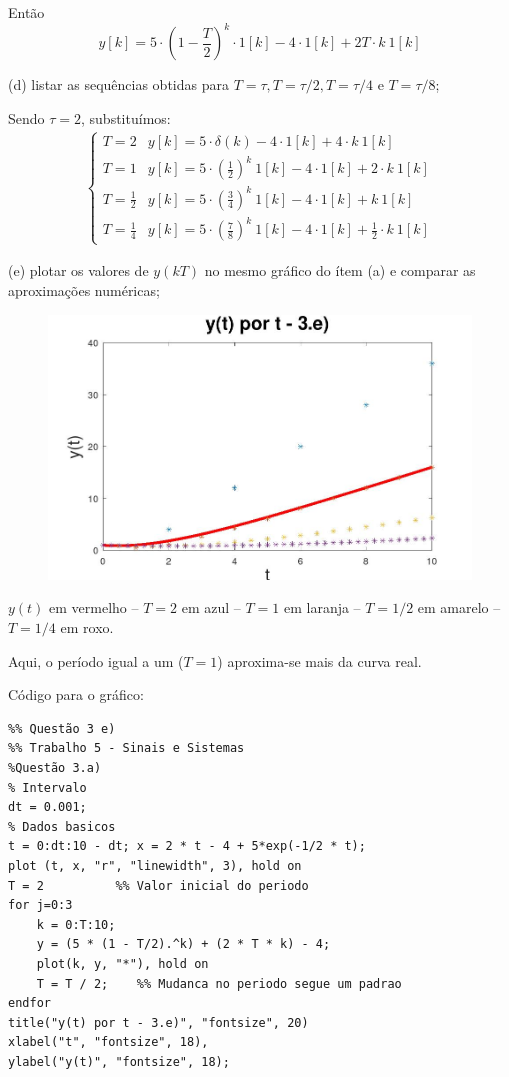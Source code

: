 \documentclass[10pt]{article}
\begin{document}
Então
\[y[k] = 5 \cdot \left(1 - \frac{T}{2}\right)^k \cdot 1[k] - 4 \cdot 1[k] + 2T \cdot k\ 1[k]\]

(d) listar as sequências obtidas para $T = \tau, T = \tau / 2, T = \tau / 4 \text{ e } T = \tau / 8$;

Sendo $\tau = 2$, substituímos:
\begin{align*}
    \begin{cases}
        T = 2 & y[k] = 5 \cdot \delta(k) - 4 \cdot 1[k] + 4 \cdot k\ 1[k]\\
        T = 1 & y[k] = 5 \cdot \left(\frac{1}{2}\right)^k \ 1[k] - 4 \cdot 1[k] + 2 \cdot k\ 1[k]\\
        T = \frac{1}{2} & y[k] = 5 \cdot \left(\frac{3}{4}\right)^k \ 1[k] - 4 \cdot 1[k] + k\ 1[k]\\
        T = \frac{1}{4} & y[k] = 5 \cdot \left(\frac{7}{8}\right)^k \ 1[k] - 4 \cdot 1[k] + \frac{1}{2} \cdot k\ 1[k]
    \end{cases}
\end{align*}

(e) plotar os valores de $y(kT)$ no mesmo gráfico do ítem (a) e comparar as aproximações numéricas;

\begin{figure}[h]
    \includegraphics[scale=0.4]{questao3e.jpg}
    \centering
\end{figure}
$y(t)$ em vermelho -- $T = 2$ em azul -- $T = 1$ em laranja -- $T = 1/2$ em amarelo -- $T = 1/4$ em roxo.

Aqui, o período igual a um ($T = 1$) aproxima-se mais da curva real.

Código para o gráfico:

\begin{verbatim}
%% Questão 3 e)
%% Trabalho 5 - Sinais e Sistemas
%Questão 3.a)
% Intervalo
dt = 0.001;
% Dados basicos
t = 0:dt:10 - dt; x = 2 * t - 4 + 5*exp(-1/2 * t);
plot (t, x, "r", "linewidth", 3), hold on
T = 2          %% Valor inicial do periodo
for j=0:3
    k = 0:T:10;
    y = (5 * (1 - T/2).^k) + (2 * T * k) - 4;
    plot(k, y, "*"), hold on
    T = T / 2;    %% Mudanca no periodo segue um padrao
endfor
title("y(t) por t - 3.e)", "fontsize", 20)
xlabel("t", "fontsize", 18),
ylabel("y(t)", "fontsize", 18);
\end{verbatim}
\end{document}
